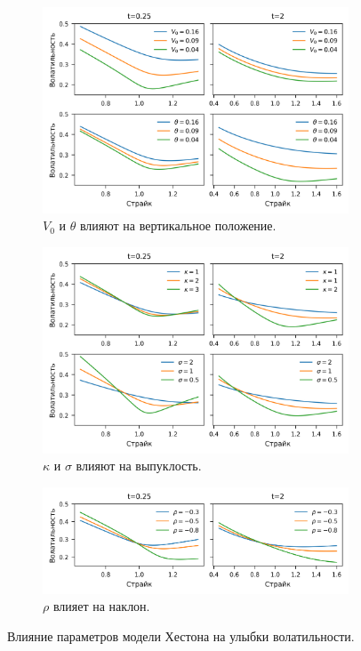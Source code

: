\begin{figure}[h]
\centering
  \begin{subfigure}{\textwidth}
    \centering
    \includegraphics{pic/heston-v0-theta.png}
    \caption{$V_0$ и $\theta$ влияют на вертикальное положение.}
    \label{hes:f:v0-theta}
  \end{subfigure}
  \begin{subfigure}{\textwidth}
    \centering
    \includegraphics{pic/heston-kappa-sigma.png}
    \caption{$\kappa$ и $\sigma$ влияют на выпуклость.}
    \label{hes:f:kappa-sigma}
  \end{subfigure}
  \begin{subfigure}{\textwidth}
    \centering
    \includegraphics{pic/heston-rho.png}
    \caption{$\rho$ влияет на наклон.}
    \label{hes:f:rho}
  \end{subfigure}
\caption{Влияние параметров модели Хестона на улыбки волатильности.}
\label{hes:f:smiles}
\end{figure}
